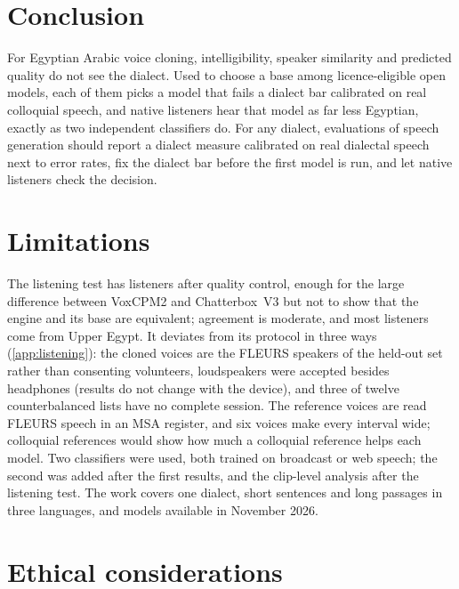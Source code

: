 \documentclass[11pt]{article}
\newcommand{\vox}{VoxCPM2\xspace}
\newcommand{\cbthree}{Chatterbox~V3\xspace}
\begin{document}
\section{Conclusion}
For Egyptian Arabic voice cloning, intelligibility, speaker similarity and predicted quality do not see the dialect. Used
to choose a base among licence-eligible open models, each of them picks a model that fails a dialect bar calibrated on
real colloquial speech, and native listeners hear that model as far less Egyptian, exactly as two independent
classifiers do. For any dialect, evaluations of speech generation should report a dialect measure calibrated on real
dialectal speech next to error rates, fix the dialect bar before the first model is run, and let native listeners check
the decision.

\section*{Limitations}
The listening test has  listeners after quality control, enough for the large difference between \vox and
\cbthree but not to show that the engine and its base are equivalent; agreement is moderate, and most listeners come from
Upper Egypt. It deviates from its protocol in three ways (\cref{app:listening}): the cloned voices are the FLEURS speakers
of the held-out set rather than consenting volunteers, loudspeakers were accepted besides headphones (results do not
change with the device), and three of twelve counterbalanced lists have no complete session. The reference voices are
read FLEURS speech in an MSA register, and six voices make every interval wide; colloquial references would show how much
a colloquial reference helps each model. Two classifiers were used, both trained on broadcast or web speech; the second
was added after the first results, and the clip-level analysis after the listening test. The work covers one dialect, short sentences and long passages in three languages,
and models available in November 2026.

\section*{Ethical considerations}
\end{document}
